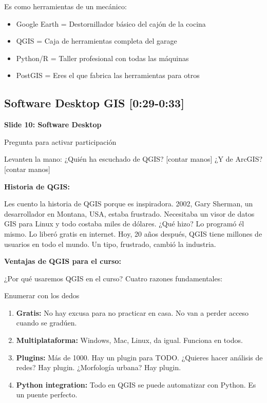 \documentclass[11pt,a4paper]{article}
\newcommand{\tiempo}[1]{\textcolor{timecolor}{\faIcon{clock} \textbf{[#1]}}}
\newcommand{\decir}[1]{\begin{tcolorbox}[colback=blue!5,colframe=usachblue,title={\faIcon{microphone} DECIR}]#1\end{tcolorbox}}
\newcommand{\hacer}[1]{\begin{tcolorbox}[colback=green!5,colframe=green!50!black,title={\faIcon{hand-point-right} HACER}]#1\end{tcolorbox}}
\begin{document}
\decir{Es como herramientas de un mecánico:
\begin{itemize}
    \item Google Earth = Destornillador básico del cajón de la cocina
    \item QGIS = Caja de herramientas completa del garage
    \item Python/R = Taller profesional con todas las máquinas
    \item PostGIS = Eres el que fabrica las herramientas para otros
\end{itemize}
}

\subsection{Software Desktop GIS \tiempo{0:29-0:33}}

\textbf{Slide 10: Software Desktop}

\hacer{Pregunta para activar participación}

\decir{Levanten la mano: ¿Quién ha escuchado de QGIS? [contar manos] ¿Y de ArcGIS? [contar manos]}

\textbf{Historia de QGIS:}

\decir{Les cuento la historia de QGIS porque es inspiradora. 2002, Gary Sherman, un desarrollador en Montana, USA, estaba frustrado. Necesitaba un visor de datos GIS para Linux y todo costaba miles de dólares. ¿Qué hizo? Lo programó él mismo. Lo liberó gratis en internet. Hoy, 20 años después, QGIS tiene millones de usuarios en todo el mundo. Un tipo, frustrado, cambió la industria.}

\textbf{Ventajas de QGIS para el curso:}

\decir{¿Por qué usaremos QGIS en el curso? Cuatro razones fundamentales:}

\hacer{Enumerar con los dedos}

\decir{
\begin{enumerate}
    \item \textbf{Gratis:} No hay excusa para no practicar en casa. No van a perder acceso cuando se gradúen.
    \item \textbf{Multiplataforma:} Windows, Mac, Linux, da igual. Funciona en todos.
    \item \textbf{Plugins:} Más de 1000. Hay un plugin para TODO. ¿Quieres hacer análisis de redes? Hay plugin. ¿Morfología urbana? Hay plugin.
    \item \textbf{Python integration:} Todo en QGIS se puede automatizar con Python. Es un puente perfecto.
\end{enumerate}
}
\end{document}
